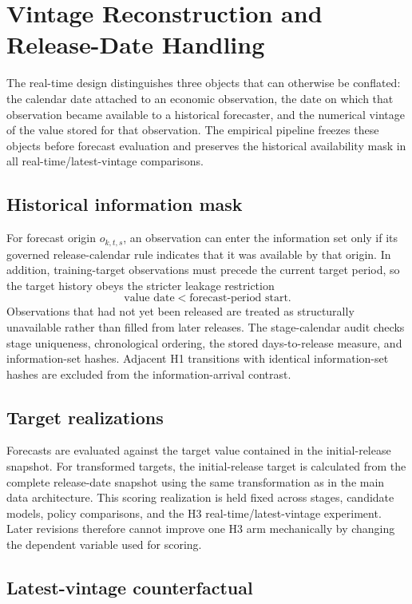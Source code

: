 \section{Vintage Reconstruction and Release-Date Handling}
\label{app:vintages}

The real-time design distinguishes three objects that can otherwise be
conflated: the calendar date attached to an economic observation, the date on
which that observation became available to a historical forecaster, and the
numerical vintage of the value stored for that observation. The empirical
pipeline freezes these objects before forecast evaluation and preserves the
historical availability mask in all real-time/latest-vintage comparisons.

\subsection{Historical information mask}

For forecast origin \(o_{k,t,s}\), an observation can enter the information set
only if its governed release-calendar rule indicates that it was available by
that origin. In addition, training-target observations must precede the current
target period, so the target history obeys the stricter leakage restriction
\[
    \text{value date}<\text{forecast-period start}.
\]
Observations that had not yet been released are treated as structurally
unavailable rather than filled from later releases. The stage-calendar audit
checks stage uniqueness, chronological ordering, the stored days-to-release
measure, and information-set hashes. Adjacent H1 transitions with identical
information-set hashes are excluded from the information-arrival contrast.

\subsection{Target realizations}

Forecasts are evaluated against the target value contained in the
initial-release snapshot. For transformed targets, the initial-release target
is calculated from the complete release-date snapshot using the same
transformation as in the main data architecture. This scoring realization is
held fixed across stages, candidate models, policy comparisons, and the H3
real-time/latest-vintage experiment. Later revisions therefore cannot improve
one H3 arm mechanically by changing the dependent variable used for scoring.

\subsection{Latest-vintage counterfactual}

